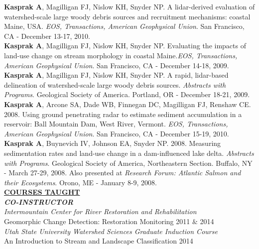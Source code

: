 \documentclass{article}
\begin{document}
\noindent \textbf{Kasprak A}, Magilligan FJ, Nislow KH, Snyder NP. A lidar-derived evaluation of watershed-scale large woody debris sources and recruitment mechanisms: coastal Maine, USA. \textit{EOS, Transactions, American Geophysical Union}. San Francisco, CA - December 13-17, 2010.\\

\noindent \textbf{Kasprak A}, Magilligan FJ, Nislow KH, Snyder NP. Evaluating the impacts of land-use change on stream morphology in coastal Maine.\textit{EOS, Transactions, American Geophysical Union}. San Francisco, CA - December 14-18, 2009.\\

\noindent \textbf{Kasprak A}, Magilligan FJ, Nislow KH, Snyder NP. A rapid, lidar-based delineation of watershed-scale large woody debris sources. \textit{Abstracts with Programs}. Geological Society of America. Portland, OR - December 18-21, 2009.\\

\noindent \textbf{Kasprak A}, Arcone SA, Dade WB, Finnegan DC, Magilligan FJ, Renshaw CE. 2008. Using ground penetrating radar to estimate sediment accumulation in a reservoir: Ball Mountain Dam, West River, Vermont. \textit{EOS, Transactions, American Geophysical Union}. San Francisco, CA - December 15-19, 2010.\\

\noindent \textbf{Kasprak A}, Buynevich IV, Johnson EA, Snyder NP. 2008. Measuring sedimentation rates and land-use change in a dam-influenced lake delta. \textit{Abstracts with Programs}. Geological Society of America, Northeastern Section. Buffalo, NY - March 27-29, 2008. Also presented at \textit{Research Forum: Atlantic Salmon and their Ecosystems}. Orono, ME - January 8-9, 2008.\\

\noindent \textbf{\underline{COURSES TAUGHT}}\\
\textbf{\textit{CO-INSTRUCTOR}}\\
\textit{Intermountain Center for River Restoration and Rehabilitation}\\
\indent Geomorphic Change Detection: Restoration Monitoring \hfill 2011 $\&$ 2014\\
\textit{Utah State University Watershed Sciences Graduate Induction Course}\\
\indent An Introduction to Stream and Landscape Classification \hfill 2014\\
\end{document}
